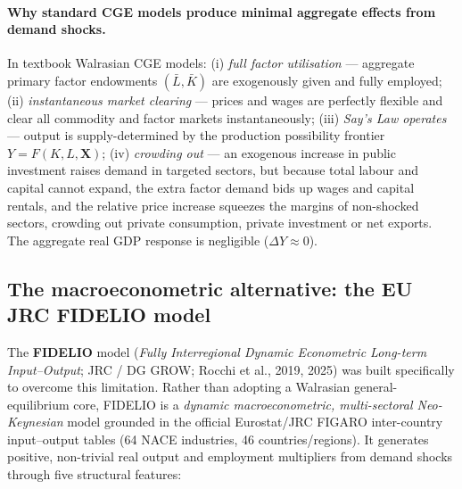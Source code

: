 \paragraph{Why standard CGE models produce minimal aggregate effects from demand shocks.}
In textbook Walrasian CGE models: (i) \emph{full factor utilisation} ---
aggregate primary factor endowments $(\bar L, \bar K)$ are exogenously given
and fully employed; (ii) \emph{instantaneous market clearing} --- prices and
wages are perfectly flexible and clear all commodity and factor markets
instantaneously; (iii) \emph{Say's Law operates} --- output is
supply-determined by the production possibility frontier
$Y = F(K, L, \mathbf{X})$; (iv) \emph{crowding out} --- an exogenous increase
in public investment raises demand in targeted sectors, but because total
labour and capital cannot expand, the extra factor demand bids up wages and
capital rentals, and the relative price increase squeezes the margins of
non-shocked sectors, crowding out private consumption, private investment or
net exports. The aggregate real GDP response is negligible
($\Delta Y \approx 0$).

\subsection{The macroeconometric alternative: the EU JRC FIDELIO model}\label{app:fidelio}

The \textbf{FIDELIO} model (\emph{Fully Interregional Dynamic Econometric
Long-term Input--Output}; JRC / DG GROW; Rocchi et al., 2019, 2025) was built
specifically to overcome this limitation. Rather than adopting a Walrasian
general-equilibrium core, FIDELIO is a \emph{dynamic macroeconometric,
multi-sectoral Neo-Keynesian} model grounded in the official Eurostat/JRC
FIGARO inter-country input--output tables (64 NACE industries, 46
countries/regions). It generates positive, non-trivial real output and
employment multipliers from demand shocks through five structural features:

